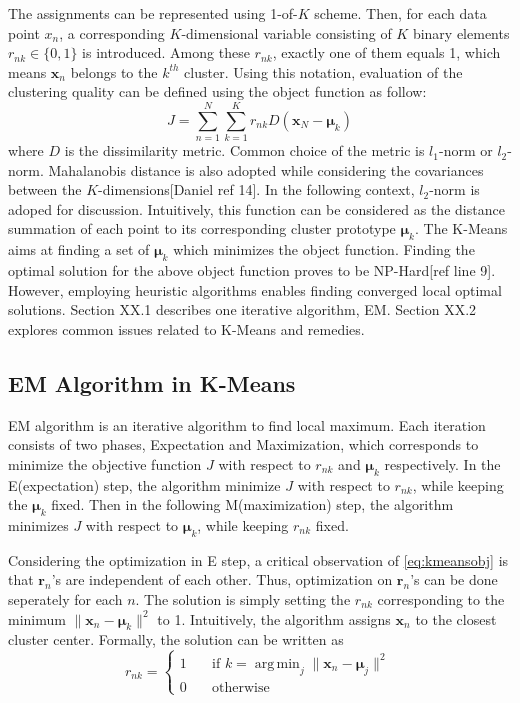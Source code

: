 The assignments can be represented using 1-of-$K$ scheme. Then, for each data point $x_n$, a corresponding  $K$-dimensional variable consisting of $K$ binary elements $r_{nk} \in \{0, 1\}$ is introduced. Among these $r_{nk}$, exactly one of them equals 1, which means $\mathbf{x}_{n}$ belongs to the $k^{th}$ cluster. Using this notation, evaluation of the clustering quality can be defined using the object function as follow:
\begin{equation}	\label{eq:kmeansobj}
J = \sum_{n=1}^{N}\sum_{k=1}^{K}r_{nk}D(\mathbf{x}_{N} - \boldsymbol{\mu}_{k})
\end{equation}
where $D$ is the dissimilarity metric. Common choice of the metric is $\mathit{l}_1$-norm or $\mathit{l}_2$-norm. Mahalanobis distance is also adopted while considering the covariances between the $K$-dimensions[Daniel ref 14]. In the following context, $\mathit{l}_2$-norm is adoped for discussion. 
 Intuitively, this function can be considered as the distance summation of each point to its corresponding cluster prototype $\boldsymbol{\mu}_k$. The K-Means aims at finding a set of $\boldsymbol{\mu}_k$ which minimizes the object function. Finding the optimal solution for the above object function proves to be NP-Hard[ref line 9]. However, employing heuristic algorithms enables finding converged local optimal solutions. Section XX.1 describes one iterative algorithm, EM. Section XX.2 explores common issues related to K-Means and remedies.
\subsection{EM Algorithm in K-Means}

EM algorithm is an iterative algorithm to find local maximum. Each iteration consists of two phases, Expectation and Maximization, which corresponds to minimize the objective function $J$ with respect to $r_{nk}$ and $\boldsymbol{\mu}_{k}$ respectively. In the E(expectation) step, the algorithm minimize $J$ with respect to $r_{nk}$, while keeping the $\boldsymbol{\mu}_{k}$ fixed. Then in the following M(maximization) step, the algorithm minimizes $J$ with respect to $\boldsymbol{\mu}_{k}$, while keeping $r_{nk}$ fixed. 

Considering the optimization in E step, a critical observation of \eqref{eq:kmeansobj} is that \(\mathbf{r}_n\)'s are independent of each other. Thus, optimization on \(\mathbf{r}_n\)'s can be done seperately for each \(n\). The solution is simply setting the \(r_{nk}\) corresponding to the minimum \(\| \mathbf{x}_n - \boldsymbol{\mu}_k \|^2\) to 1.  Intuitively, the algorithm assigns \(\mathbf{x}_n\) to the closest cluster center. Formally, the solution can be written as
\begin{equation}
 r_{nk} =
    \begin{cases}
        1   & \quad \text{if } k = \operatorname{arg\,min}_j \parallel \mathbf{x}_{n} - \mathbf{\mu}_{j} {\parallel}^2 \\
        0   & \quad \text{otherwise}
    \end{cases}
\end{equation}

